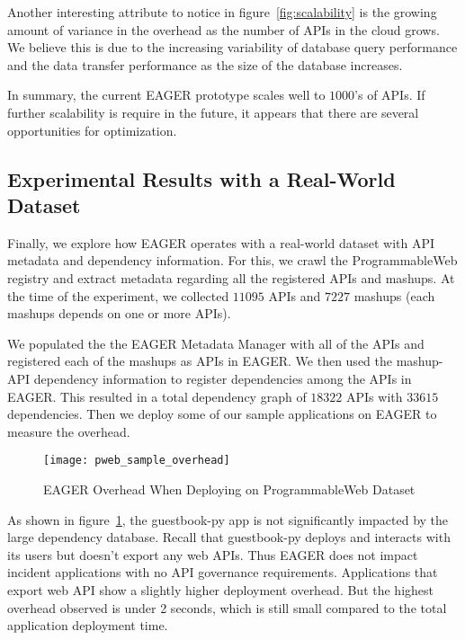 Another interesting attribute to notice in figure~\ref{fig:scalability} is the
growing amount of variance in the overhead as the number of APIs in the cloud
grows.  We believe this is due to the increasing variability of database query
performance and the data transfer performance as the size of the database
increases.

In summary, the current EAGER prototype scales well to $1000$'s of APIs.
If further scalability is require in the future, it appears that there are
several opportunities for optimization.

\subsection{Experimental Results with a Real-World Dataset}

Finally, we explore how EAGER operates with a real-world dataset with API
metadata and dependency information. For this, we crawl the ProgrammableWeb
registry and extract metadata regarding all the registered APIs and mashups.
At the time of the experiment, we collected $11095$ APIs and $7227$ 
mashups (each mashups depends on one or more APIs).

We populated the the EAGER Metadata Manager with all of the APIs and
registered each of the mashups as APIs in EAGER. We then used the
mashup-API dependency information to register dependencies among the APIs in 
EAGER. This resulted in a 
total dependency graph of $18322$ APIs with $33615$ dependencies. 
Then we deploy
some of our sample applications on EAGER to measure the overhead.

\begin{figure}
\centering
\texttt{[image: pweb\_sample\_overhead]}
\vspace{-0.01in}
\caption{EAGER Overhead When Deploying on ProgrammableWeb Dataset}
\label{fig:pweb_sample_overhead}
\end{figure}

As shown in figure~\ref{fig:pweb_sample_overhead}, the guestbook-py app is not
significantly impacted by the large dependency database. 
Recall that 
guestbook-py deploys and interacts with its users but doesn't export any 
web APIs.  Thus EAGER does not impact incident applications with no API
governance requirements. 
Applications that export web API show a slightly higher deployment overhead. 
But the highest overhead observed is under 2 seconds, which is still small 
compared
to the total application deployment time. 

